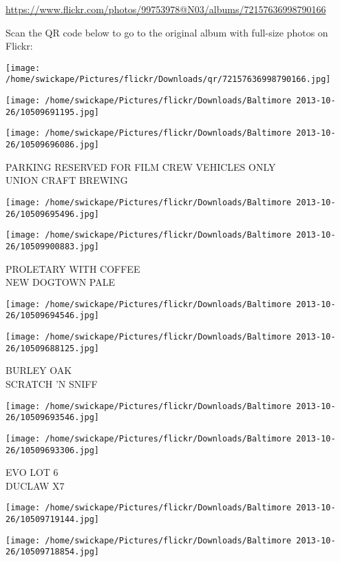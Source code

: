\documentclass[10pt,letterpaper]{article}
\begin{document}
\url{https://www.flickr.com/photos/99753978@N03/albums/72157636998790166}

Scan the QR code below to go to the original album with full-size photos on Flickr:

\texttt{[image: /home/swickape/Pictures/flickr/Downloads/qr/72157636998790166.jpg]}
\pagebreak

\texttt{[image: /home/swickape/Pictures/flickr/Downloads/Baltimore 2013-10-26/10509691195.jpg]}

\vspace{0.25in}
\texttt{[image: /home/swickape/Pictures/flickr/Downloads/Baltimore 2013-10-26/10509696086.jpg]}

PARKING RESERVED FOR FILM CREW VEHICLES ONLY\\
UNION CRAFT BREWING
\pagebreak

\texttt{[image: /home/swickape/Pictures/flickr/Downloads/Baltimore 2013-10-26/10509695496.jpg]}

\vspace{0.25in}
\texttt{[image: /home/swickape/Pictures/flickr/Downloads/Baltimore 2013-10-26/10509900883.jpg]}

PROLETARY WITH COFFEE\\
NEW DOGTOWN PALE
\pagebreak

\texttt{[image: /home/swickape/Pictures/flickr/Downloads/Baltimore 2013-10-26/10509694546.jpg]}

\vspace{0.25in}
\texttt{[image: /home/swickape/Pictures/flickr/Downloads/Baltimore 2013-10-26/10509688125.jpg]}

BURLEY OAK\\
SCRATCH 'N SNIFF
\pagebreak

\texttt{[image: /home/swickape/Pictures/flickr/Downloads/Baltimore 2013-10-26/10509693546.jpg]}

\vspace{0.25in}
\texttt{[image: /home/swickape/Pictures/flickr/Downloads/Baltimore 2013-10-26/10509693306.jpg]}

EVO LOT 6\\
DUCLAW X7
\pagebreak

\texttt{[image: /home/swickape/Pictures/flickr/Downloads/Baltimore 2013-10-26/10509719144.jpg]}

\vspace{0.25in}
\texttt{[image: /home/swickape/Pictures/flickr/Downloads/Baltimore 2013-10-26/10509718854.jpg]}
\end{document}
